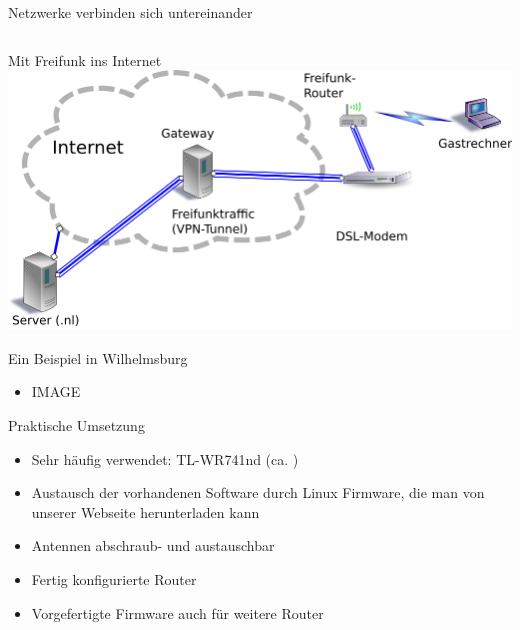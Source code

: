 \documentclass[c]{beamer}
\begin{document}
\begin{frame}{Netzwerke verbinden sich untereinander}
\begin{columns}[c]
\begin{column}[r]{.5\textwidth}
{{}}
		\end{column}
	\end{columns}
\end{frame}

\begin{frame}{Mit Freifunk ins Internet}
	\includegraphics[width=\textwidth]{Freifunk_Knotenanbindung}
\end{frame}

\begin{frame}{Ein Beispiel in Wilhelmsburg}
	\begin{itemize}
		\item IMAGE
	\end{itemize}
\end{frame}


\begin{frame}{Praktische Umsetzung}
	\begin{itemize}
		\item Sehr häufig verwendet: TL-WR741nd (ca. )
		\item Austausch der vorhandenen Software durch Linux Firmware, die man von unserer Webseite herunterladen kann
		\item Antennen abschraub- und austauschbar
		\item Fertig konfigurierte Router
		\item Vorgefertigte Firmware auch für weitere Router
	\end{itemize}
\end{frame}
\end{document}
